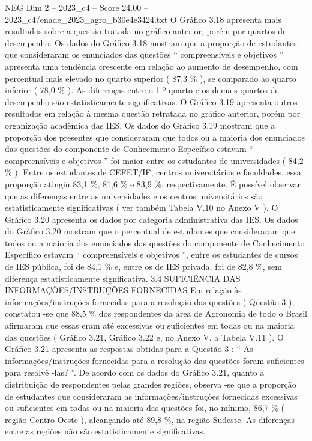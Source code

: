 \begin{textsample}{NEG Dim 2 – 2023\_c4 – Score 24.00 – 2023\_c4/enade\_2023\_agro\_b30e4e3424.txt}
O Gráfico 3.18 apresenta mais resultados sobre a questão tratada no gráfico anterior, porém por quartos de desempenho.
Os dados do Gráfico 3.18 mostram que a proporção de estudantes que consideraram os enunciados das questões “ compreensíveis e objetivos ” apresenta uma tendência crescente em relação ao aumento de desempenho, com percentual mais elevado no quarto superior ( 87,3 \% ), se comparado ao quarto inferior ( 78,0 \% ).
As diferenças entre o 1.º quarto e os demais quartos de desempenho são estatisticamente significativas.
O Gráfico 3.19 apresenta outros resultados em relação à mesma questão retratada no gráfico anterior, porém por organização acadêmica das IES.
Os dados do Gráfico 3.19 mostram que a proporção dos presentes que consideraram que todos ou a maioria dos enunciados das questões do componente de Conhecimento Específico estavam “ compreensíveis e objetivos ” foi maior entre os estudantes de universidades ( 84,2 \% ).
Entre os estudantes de CEFET/IF, centros universitários e faculdades, essa proporção atingiu 83,1 \%, 81,6 \% e 83,9 \%, respectivamente.
É possível observar que as diferenças entre as universidades e os centros universitários são estatisticamente significativas ( ver também Tabela V.10 no Anexo V ).
O Gráfico 3.20 apresenta os dados por categoria administrativa das IES.
Os dados do Gráfico 3.20 mostram que o percentual de estudantes que consideraram que todos ou a maioria dos enunciados das questões do componente de Conhecimento Específico estavam “ compreensíveis e objetivos ”, entre os estudantes de cursos de IES pública, foi de 84,1 \% e, entre os de IES privada, foi de 82,8 \%, sem diferença estatisticamente significativa. 3.4 SUFICIÊNCIA DAS INFORMAÇÕES/INSTRUÇÕES FORNECIDAS Em relação às informações/instruções fornecidas para a resolução das questões ( Questão 3 ), constatou -se que 88,5 \% dos respondentes da área de Agronomia de todo o Brasil afirmaram que essas eram até excessivas ou suficientes em todas ou na maioria das questões ( Gráfico 3.21, Gráfico 3.22 e, no Anexo V, a Tabela V.11 ).
O Gráfico 3.21 apresenta as respostas obtidas para a Questão 3 : “ As informações/instruções fornecidas para a resolução das questões foram suficientes para resolvê -las? ”.
De acordo com os dados do Gráfico 3.21, quanto à distribuição de respondentes pelas grandes regiões, observa -se que a proporção de estudantes que consideraram as informações/instruções fornecidas excessivas ou suficientes em todas ou na maioria das questões foi, no mínimo, 86,7 \% ( região Centro-Oeste ), alcançando até 89,8 \%, na região Sudeste.
As diferenças entre as regiões não são estatisticamente significativas.

\end{textsample}
